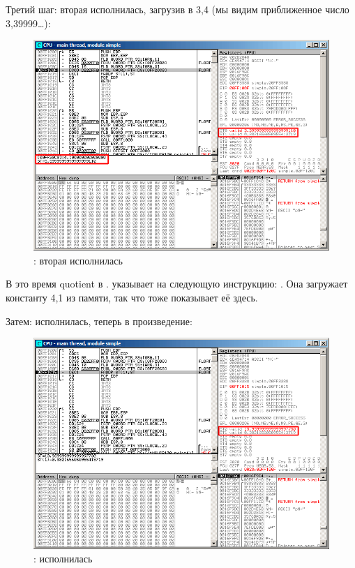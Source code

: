 \clearpage
Третий шаг: вторая \FLD 
исполнилась, загрузив в  3,4 (мы видим приближенное число 3,39999\ldots): 

\begin{figure}[H]
\centering
\includegraphics[scale=\FigScale]{patterns/12_FPU/1_simple/olly3.png}
\caption{\olly: вторая \FLD исполнилась}
\label{fig:FPU_simple_olly_3}
\end{figure}

В это время \gls{quotient}  
в .
\EIP указывает на следующую инструкцию: \FMUL. 
Она загружает константу 4,1 из памяти, так что \olly тоже показывает её здесь.

\clearpage
Затем: \FMUL исполнилась, теперь в  произведение:

\begin{figure}[H]
\centering
\includegraphics[scale=\FigScale]{patterns/12_FPU/1_simple/olly4.png}
\caption{\olly: \FMUL исполнилась}
\label{fig:FPU_simple_olly_4}
\end{figure}

